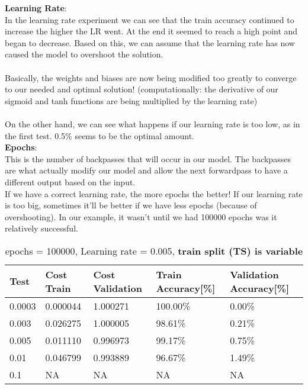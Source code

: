 \documentclass{report}
\begin{document}
\textbf{Learning Rate}: \\

In the learning rate experiment we can see that the train accuracy continued to increase the higher the LR went. At the end it seemed to reach a high point and began to decrease. Based on this, we can assume that the learning rate has now caused the model to overshoot the solution. \\ \\
Basically, the weights and biases are now being modified too greatly to converge to our needed and optimal solution! (computationally: the derivative of our sigmoid and tanh functions are being multiplied by the learning rate) \\ \\
On the other hand, we can see what happens if our learning rate is too low, as in the first test. 0.5\% seems to be the optimal amount. \\

\textbf{Epochs}: \\

This is the number of backpasses that will occur in our model. The backpasses are what actually modify our model and allow the next forwardpass to have a different output based on the input.\\

If we have a correct learning rate, the more epochs the better! If our learning rate is too big, sometimes it'll be better if we have less epochs (because of overshooting). In our example, it wasn't until we had 100000 epochs was it relatively successful.

\newpage

\begin{table}[h!]
\centering
\caption{epochs = 100000, Learning rate = 0.005, \textbf{train split (TS) is variable}}
\vspace{10pt}  %
\begin{tabularx}{\textwidth}{@{} X X X X X @{}}
\hline
{Test} & {Cost Train} & {Cost Validation} & {Train Accuracy[\%]} & {Validation Accuracy[\%]} \\
\hline
0.0003 & 0.000044 & 1.000271 & 100.00\% & 0.00\% \\
\hline
0.003 & 0.026275 & 1.000005 & 98.61\% & 0.21\% \\
\hline
0.005 & 0.011110 & 0.996973 & 99.17\% & 0.75\% \\
\hline
0.01 & 0.046799 & 0.993889 & 96.67\% & 1.49\% \\
\hline
0.1 & NA & NA & NA & NA \\
\hline
\end{tabularx}
\end{table}
\end{document}
